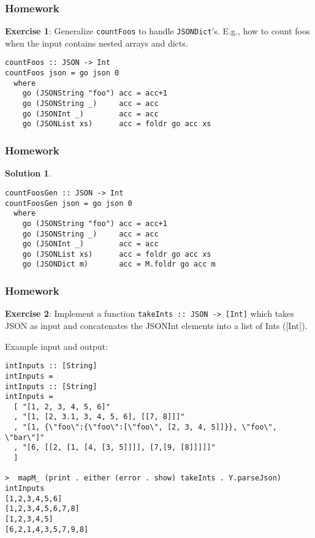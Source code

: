 \documentclass{beamer}
\begin{document}
\begin{frame}[fragile]
\frametitle{Homework}

\textbf{Exercise 1}: Generalize \verb+countFoos+ to handle \verb+JSONDict+'s.
E.g., how to count foos when the input contains nested arrays and
dicts.

\bigskip

\begin{verbatim}
countFoos :: JSON -> Int
countFoos json = go json 0
  where
    go (JSONString "foo") acc = acc+1
    go (JSONString _)     acc = acc
    go (JSONInt _)        acc = acc
    go (JSONList xs)      acc = foldr go acc xs
\end{verbatim}

\end{frame}

\begin{frame}[fragile]
\frametitle{Homework}

\textbf{Solution 1}.

\bigskip

\begin{verbatim}
countFoosGen :: JSON -> Int
countFoosGen json = go json 0
  where
    go (JSONString "foo") acc = acc+1
    go (JSONString _)     acc = acc
    go (JSONInt _)        acc = acc
    go (JSONList xs)      acc = foldr go acc xs
    go (JSONDict m)       acc = M.foldr go acc m
\end{verbatim}

\end{frame}


\begin{frame}[fragile]
\frametitle{Homework}

\textbf{Exercise 2}: Implement a function \verb+takeInts :: JSON -> [Int]+
which takes JSON as input and concatenates the JSONInt elements into a
list of Ints ([Int]).

\bigskip
Example input and output:

{\tiny
\begin{verbatim}
intInputs :: [String]
intInputs =
intInputs :: [String]
intInputs =
  [ "[1, 2, 3, 4, 5, 6]"
  , "[1, [2, 3.1, 3, 4, 5, 6], [[7, 8]]]"
  , "[1, {\"foo\":{\"foo\":[\"foo\", [2, 3, 4, 5]]}}, \"foo\", \"bar\"]"
  , "[6, [[2, [1, [4, [3, 5]]]], [7,[9, [8]]]]]"
  ]

>  mapM_ (print . either (error . show) takeInts . Y.parseJson) intInputs
[1,2,3,4,5,6]
[1,2,3,4,5,6,7,8]
[1,2,3,4,5]
[6,2,1,4,3,5,7,9,8]
\end{verbatim}
}
\end{frame}
\end{document}
